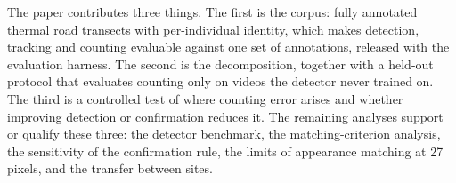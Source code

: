The paper contributes three things. The first is the corpus: fully annotated thermal road
transects with per-individual identity, which makes detection, tracking and counting
evaluable against one set of annotations, released with the evaluation harness. The second
is the decomposition, together with a held-out protocol that evaluates counting only on
videos the detector never trained on. The third is a controlled test of where counting
error arises and whether improving detection or confirmation reduces it. The remaining
analyses support or qualify these three: the detector benchmark, the matching-criterion
analysis, the sensitivity of the confirmation rule, the limits of appearance matching at 27
pixels, and the transfer between sites.
